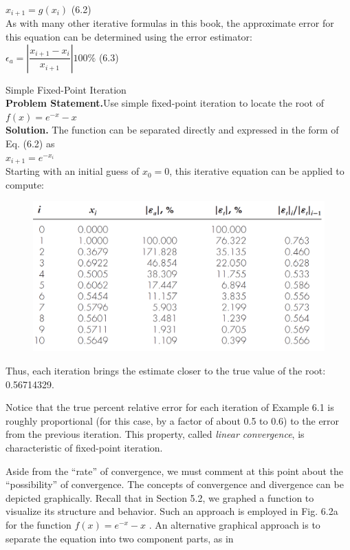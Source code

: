 \documentclass[../main.tex]{subfiles}
\begin{document}
$x_{i+1} = g(x_i)$
\hfill (6.2)\\

\noindent As with many other iterative formulas in this book, the approximate error for this equation
can be determined using the error estimator:\\

$\epsilon_a = \left\lvert \dfrac{x_{i+1}-x_i}{x_{i+1}} \right\rvert 100\%$
\hfill (6.3)\\

\begin{example} Simple Fixed-Point Iteration\\
    
    \noindent\textbf{Problem Statement.}\quad Use simple fixed-point iteration to locate the root of
    $f(x) = e^{-x}-x$\\

    \noindent\textbf{Solution.} The function can be separated directly and expressed in the form of Eq. (6.2) as\\

    $x_{i+1} = e^{-x_i}$\\

    \noindent Starting with an initial guess of $x_0 = 0$, this iterative equation can be applied to compute:\\

    \begin{figure}[h]
        \includegraphics[width=0.6\linewidth]{./images/example_6_1_1}
    \end{figure}

    \noindent Thus, each iteration brings the estimate closer to the true value of the root: 0.56714329.
\end{example}

Notice that the true percent relative error for each iteration of Example 6.1 is roughly
proportional (for this case, by a factor of about 0.5 to 0.6) to the error from the previous
iteration. This property, called \emph{linear convergence}, is characteristic of fixed-point iteration.

Aside from the ``rate'' of convergence, we must comment at this point about the ``possibility'' 
of convergence. The concepts of convergence and divergence can be depicted
graphically. Recall that in Section 5.2, we graphed a function to visualize its structure and
behavior. Such an approach is employed in Fig. 6.2a for the function $f (x) = e^{-x} - x$ . An
alternative graphical approach is to separate the equation into two component parts, as in\\
\end{document}
